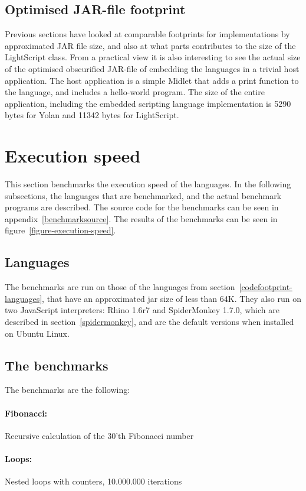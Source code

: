 \documentclass[11pt]{report}
\begin{document}
\subsection{Optimised JAR-file footprint}
Previous sections have looked at comparable footprints for implementations by approximated JAR file size, and also at what parts contributes to the size of the LightScript class.
From a practical view it is also interesting to see the actual size of the optimised obscurified JAR-file of embedding the languages in a trivial host application.
The host application is a simple Midlet that adds a print function to the language, and includes a hello-world program.
The size of the entire application, including the embedded scripting language implementation is 5290 bytes for Yolan and 11342 bytes for LightScript. 

\section{Execution speed}
This section benchmarks the execution speed of the languages. 
In the following subsections, the languages that are benchmarked, and the actual benchmark programs are described.
The source code for the benchmarks can be seen in appendix~\ref{benchmarksource}.
The results of the benchmarks can be seen in figure~\ref{figure-execution-speed}.

\subsection{Languages}
The benchmarks are run on those of the languages from section~\ref{codefootprint-languages}, that have an approximated jar size of less than 64K. They also run on two JavaScript interpreters: Rhino 1.6r7 and SpiderMonkey 1.7.0, which are described in section~\ref{spidermonkey}, and are the default versions when installed on Ubuntu Linux.

\subsection{The benchmarks}
The benchmarks are the following:

\paragraph{Fibonacci:} Recursive calculation of the 30'th Fibonacci number
\paragraph{Loops:} Nested loops with counters, 10.000.000 iterations
\end{document}
